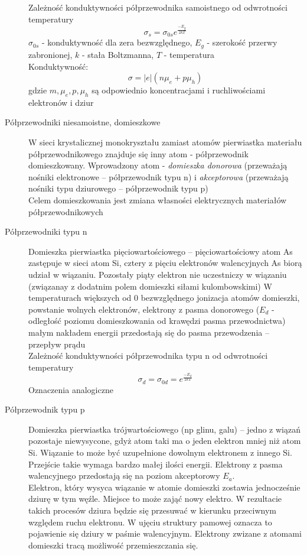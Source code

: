 \documentclass[a4paper,11pt]{article}
\begin{document}
\begin{description}
  Zależność konduktywności półprzewodnika samoistnego od odwrotności temperatury
  $$\sigma_s = \sigma_{0s}e^{\frac{-E_g}{2kT}}$$
  $\sigma_{0s}$ - konduktywność dla zera bezwzględnego, $E_g$ - szerokość przerwy zabronionej, $k$ - stała Boltzmanna, $T$ - temperatura\\
  Konduktywność:
  $$\sigma = |e|\left(n\mu_e+p\mu_h\right)$$
  gdzie $m,\mu_e,p,\mu_h$ są odpowiednio koncentracjami i ruchliwościami elektronów i dziur
\item[Półprzewodniki niesamoistne, domieszkowe] W sieci krystalicznej monokryształu zamiast atomów pierwiastka materiału półprzewodnikowego znajduje się inny atom - półprzewodnik domieszkowany. Wprowadzony atom - \emph{domieszka donorowa} (przeważają nośniki elektronowe -- półprzewodnik typu n) i \emph{akceptorowa} (przeważają nośniki typu dziurowego -- półprzewodnik typu p)\\
  Celem domieszkowania jest zmiana własności elektrycznych materiałów półprzewodnikowych
\item[Półprzewodniki typu n] Domieszka pierwiastka pięciowartościowego -- pięciowartościowy atom As zastępuje w sieci atom Si, cztery z pięciu elektronów walencyjnych As biorą udział w wiązaniu. Pozostały piąty elektron nie uczestniczy w wiązaniu (związanay z dodatnim polem domieszki siłami kulombowskimi) W temperaturach większych od 0 bezwzględnego jonizacja atomów domieszki, powstanie wolnych elektronów, elektrony z pasma donorowego ($E_d$ - odległość poziomu domieszkowania od krawędzi pasma przewodnictwa) małym nakładem energii przedostają się do pasma przewodzenia -- przepływ prądu\\
  Zależność konduktywności półprzewodnika typu n od odwrotności temperatury
  $$\sigma_d=\sigma_{0d}=e^{\frac{-E_d}{2kT}}$$
  Oznaczenia analogiczne
\item[Półprzewodnik typu p] Domieszka pierwiastka trójwartościowego (np glinu, galu) -- jedno z wiązań pozostaje niewysycone, gdyż atom taki ma o jeden elektron mniej niż atom Si. Wiązanie to może być uzupełnione dowolnym elektronem z innego Si. Przejście takie wymaga bardzo małej ilości energii. Elektrony z pasma walencyjnego przedostają się na poziom akceptorowy $E_a$.\\
  Elektron, który wysyca wiązanie w atomie domieszki zostawia jednocześnie dziurę w tym węźle. Miejsce to może zająć nowy elektro. W rezultacie takich procesów dziura będzie się przesuwać w kierunku przeciwnym względem ruchu elektronu. W ujęciu struktury pamowej oznacza to pojawienie się dziury w paśmie walencyjnym. Elektrony zwizane z atomami domieszki tracą możliwość przemieszczania się.\\

\end{description}
\end{document}
